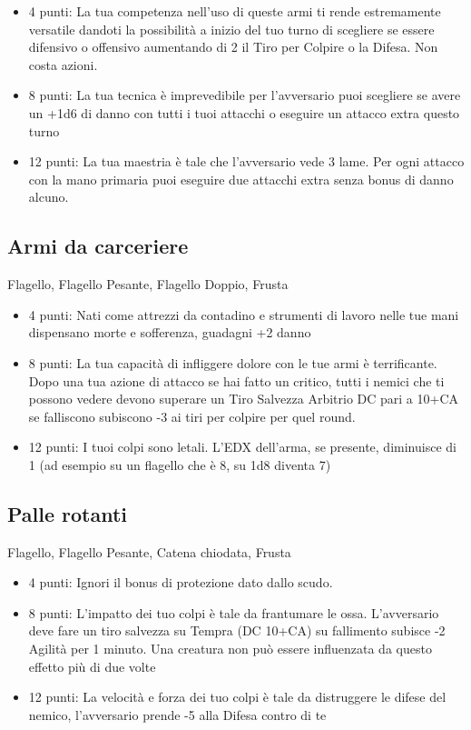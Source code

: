 \documentclass[a4paper,11pt,twoside,openany]{book}
\begin{document}
\begin{itemize}
	\item 4 punti: La tua competenza nell'uso di queste armi ti rende estremamente versatile dandoti la possibilità a inizio del tuo turno di scegliere se essere difensivo o offensivo aumentando di 2 il Tiro per Colpire o la Difesa. Non costa azioni.

	\item 8 punti: La tua tecnica è imprevedibile per l'avversario puoi scegliere se avere un +1d6 di danno con tutti i tuoi attacchi o eseguire un attacco extra questo turno

	\item 12 punti: La tua maestria è tale che l'avversario vede 3 lame. Per ogni attacco con la mano primaria puoi eseguire due attacchi extra senza bonus di danno alcuno.
\end{itemize}

\subsection{Armi da carceriere}  Flagello, Flagello Pesante, Flagello Doppio, Frusta

\begin{itemize}
	\item 4 punti: Nati come attrezzi da contadino e strumenti di lavoro nelle tue mani dispensano morte e sofferenza, guadagni +2 danno

	\item 8 punti: La tua capacità di infliggere dolore con le tue armi è terrificante. Dopo una tua azione di attacco se hai fatto un critico, tutti i nemici che ti possono vedere devono superare un Tiro Salvezza Arbitrio DC pari a 10+CA se falliscono subiscono -3 ai tiri per colpire per quel round.

	\item 12 punti: I tuoi colpi sono letali. L'EDX dell'arma, se presente, diminuisce di 1 (ad esempio su un flagello che è 8, su 1d8 diventa 7)
\end{itemize}

\subsection{Palle rotanti} Flagello, Flagello Pesante, Catena chiodata, Frusta

\begin{itemize}
	\item 4 punti: Ignori il bonus di protezione dato dallo scudo.

	\item 8 punti: L'impatto dei tuo colpi è tale da frantumare le ossa. L'avversario deve fare un tiro salvezza su Tempra (DC 10+CA) su fallimento subisce -2 Agilità per 1 minuto. Una creatura non può essere influenzata da questo effetto più di due volte

	\item 12 punti: La velocità e forza dei tuo colpi è tale da distruggere le difese del nemico, l'avversario prende -5 alla Difesa contro di te
\end{itemize}
\end{document}
